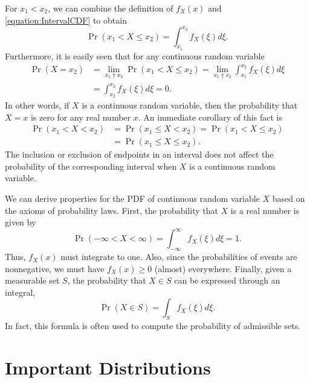 For $x_1 < x_2$, we can combine the definition of $f_X(x)$ and \eqref{equation:IntervalCDF} to obtain
\begin{equation*}
\Pr (x_1 < X \leq x_2) = \int_{x_1}^{x_2} f_X (\xi) d\xi .
\end{equation*}
Furthermore, it is easily seen that for any continuous random variable
\begin{equation*}
\begin{split}
\Pr (X = x_2) &= \lim_{x_1 \uparrow x_2} \Pr (x_1 < X \leq x_2)
= \lim_{x_1 \uparrow x_2} \int_{x_1}^{x_2} f_X (\xi) d\xi \\
&= \int_{x_2}^{x_2} f_X (\xi) d\xi = 0.
\end{split}
\end{equation*}
In other words, if $X$ is a continuous random variable, then the probability that $X = x$ is zero for any real number $x$.
An immediate corollary of this fact is
\begin{equation*}
\begin{split}
\Pr (x_1 < X < x_2)
&= \Pr (x_1 \leq X < x_2)
= \Pr (x_1 < X \leq x_2) \\
&= \Pr (x_1 \leq X \leq x_2) .
\end{split}
\end{equation*}
The inclusion or exclusion of endpoints in an interval does not affect the probability of the corresponding interval when $X$ is a continuous random variable.

We can derive properties for the PDF of continuous random variable $X$ based on the axioms of probability laws.
First, the probability that $X$ is a real number is given by
\begin{equation*}
\Pr (-\infty < X < \infty) = \int_{-\infty}^{\infty} f_X (\xi) d\xi = 1.
\end{equation*}
Thus, $f_X (x)$ must integrate to one.
Also, since the probabilities of events are nonnegative, we must have $f_X (x) \geq 0$ (almost) everywhere.
Finally, given a measurable set $S$, the probability that $X \in S$ can be expressed through an integral,
\begin{equation*}
\Pr (X \in S) = \int_S f_X (\xi) d\xi .
\end{equation*}
In fact, this formula is often used to compute the probability of admissible sets.


\section{Important Distributions}

